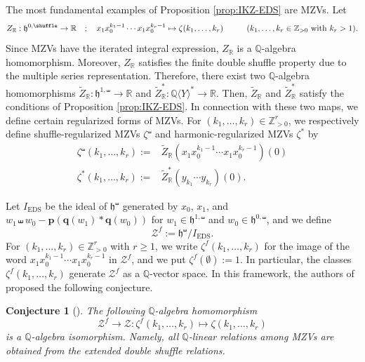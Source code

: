 \documentclass[15pt,oneside,reqno]{amsart}
\newtheorem{conj}[df]{Conjecture}
\theoremstyle{remark}{
\newtheorem{lem}[df]{Lemma}
\newtheorem{prop}[df]{Proposition}
\newtheorem{ex}[df]{Example}
\newtheorem{rmk}[df]{Remark}
}
\newcommand{\ide}[1]{\mathfrak{#1}}
\newcommand{\Q}{\mathbb{Q}}
\DeclareMathOperator{\EDS}{EDS}
\begin{document}
\begin{ex}\label{ex:reg-MZV}
The most fundamental examples of Proposition \ref{prop:IKZ-EDS} are MZVs.
Let 
\[
Z_{\mathbb{R}} : \ide{h}^{0,\shuffle} \rightarrow \mathbb{R} \quad ; \quad x_1x_0^{k_1-1}\cdots x_1x_0^{k_r-1} \mapsto \zeta(k_1,\ldots,k_r) \text{\hspace{1cm}($k_1,\ldots,k_r\in\mathbb{Z}_{>0}$ with $k_r>1$}).
\]
Since MZVs have the iterated integral expression, $Z_{\mathbb{R}}$ is a $\mathbb{Q}$-algebra homomorphism.
Moreover, $Z_{\mathbb{R}}$ satisfies the finite double shuffle property due to the multiple series representation. 
Therefore, there exist two $\mathbb{Q}$-algebra homomorphisms $\widetilde{Z}_{\mathbb{R}} : \ide{h}^{1,\shuffle} \rightarrow \mathbb{R}$ and $\widetilde{Z}^*_{\mathbb{R}} : \Q\langle Y \rangle^{*} \rightarrow \mathbb{R}$. 
Then, $\widetilde{Z}_{\mathbb{R}}$ and $\widetilde{Z}^*_{\mathbb{R}}$ satisfy the conditions of Proposition \ref{prop:IKZ-EDS}.
In connection with these two maps, we define certain regularized forms of MZVs. For $(k_1,\ldots,k_r)\in\mathbb{Z}_{>0}^r$, we respectively define shuffle-regularized MZVs $\zeta^{\shuffle}$ and harmonic-regularized MZVs $\zeta^*$ by
\begin{align*}
\zeta^{\shuffle}(k_1,\ldots,k_r) :=& \widetilde{Z}_{\mathbb{R}}(x_1x_0^{k_1-1}\cdots x_1x_0^{k_r-1})(0)\\
\zeta^{*}(k_1,\ldots,k_r) :=& \widetilde{Z}^*_{\mathbb{R}}(y_{k_1}\cdots y_{k_r})(0).
\end{align*}
\end{ex}

Let $I_{\EDS}$ be the ideal of $\ide{h}^{\shuffle}$ generated by $x_0$, $x_1$, and $w_1\shuffle w_0 - \mathbf{p}(\mathbf{q}(w_1) * \mathbf{q}(w_0))$ for $w_1\in \ide{h}^{1,\shuffle}$ and $w_0 \in \ide{h}^{0,\shuffle}$, and we define
\[
\mathcal{Z}^f := \ide{h}^{\shuffle}/I_{\EDS}.
\]
For $(k_1,\ldots,k_r)\in \mathbb{Z}_{>0}^r$ with $r\ge1$, we write $\zeta^f(k_1,\ldots,k_r)$ for the image of the word $x_1x_0^{k_1-1}\cdots x_1x_0^{k_r-1}$ in $\mathcal{Z}^f$, and we put $\zeta^f(\emptyset):=1$.
In particular, the classes $\zeta^f(k_1,\ldots,k_r)$ generate $\mathcal{Z}^f$ as a $\Q$-vector space.
In this framework, the authors of \cite{Ihara-Kaneko-Zagier} proposed the following conjecture.

\begin{conj}[{\cite{Ihara-Kaneko-Zagier}}]\label{conj:EDS}
The following $\Q$-algebra homomorphism
\[
\mathcal{Z}^f \rightarrow \mathcal{Z} : \zeta^f(k_1,\ldots,k_r)\mapsto  \zeta(k_1,\ldots,k_r)
\]
is a $\Q$-algebra isomorphism.
Namely, all $\Q$-linear relations among MZVs are obtained from the extended double shuffle relations.
\end{conj}
\end{document}
